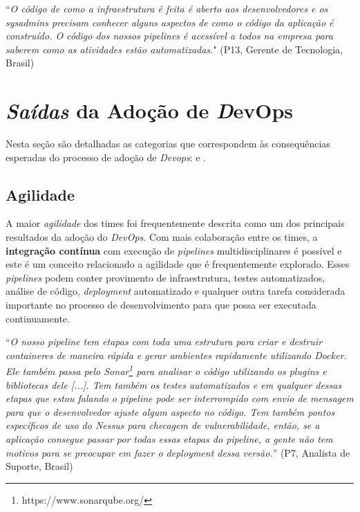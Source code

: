 \begin{mq}
``\emph{O código de como a infraestrutura é feita é aberto aos desenvolvedores
e os sysadmins precisam conhecer alguns aspectos de como o código da aplicação
é construído. O código dos nossos pipelines é acessível a todos na empresa
para saberem como as atividades estão automatizadas.}"
(P13, Gerente de Tecnologia, Brasil)
\end{mq}

\section{\emph{Saídas} da Adoção de {\emph DevOps}}\label{secao_saidas}

Nesta seção são detalhadas as categorias que correspondem às consequências
esperadas do processo de adoção de {\it Devops}:  e .

\subsection{Agilidade}\label{subsecao_agilidade}

A maior {\it agilidade} dos times foi frequentemente descrita como um dos
principais resultados da adoção do {\it DevOps}. Com mais colaboração entre os
times, a {\bf integração contínua} com execução de {\it pipelines}
multidisciplinares é possível e este é um conceito relacionado a agilidade que
é frequentemente explorado. Esses {\it pipelines} podem conter provimento
de infraestrutura, testes automatizados, análise de código, {\it deployment}
automatizado e qualquer outra tarefa considerada importante no processo de
desenvolvimento para que possa ser executada continuamente.

\begin{mq}
``\emph{O nosso pipeline tem etapas com toda uma estrutura para criar e destruir
containeres de maneira rápida e gerar ambientes rapidamente utilizando Docker.
Ele também passa pelo Sonar\footnote{https://www.sonarqube.org/} para
analisar o código utilizando os plugins e bibliotecas dele [...]. Tem também os
testes automatizados e em qualquer dessas etapas que estou falando o pipeline
pode ser interrompido com envio de mensagem para que o desenvolvedor ajuste
algum aspecto no código. Tem também pontos específicos de uso do Nessus
para checagem de vulnerabilidade, então, se a aplicação consegue passar por
todas essas etapas do pipeline, a gente não tem motivos para se preocupar em
fazer o deployment dessa versão.}'' (P7, Analista de Suporte, Brasil)
\end{mq}

